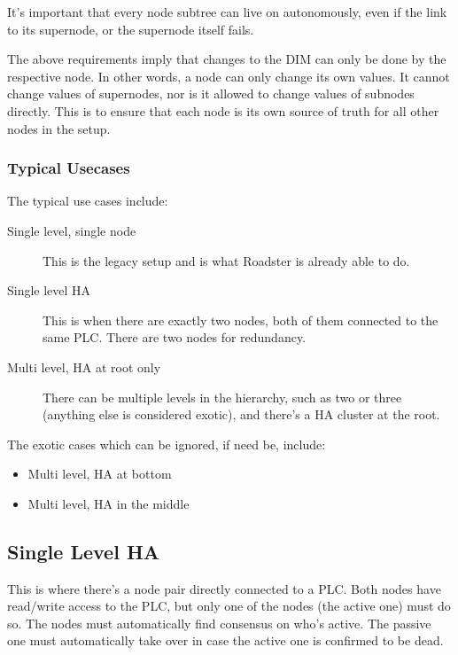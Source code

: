 It's important that every node subtree can live on autonomously, even if the
link to its supernode, or the supernode itself fails.

The above requirements imply that changes to the DIM can only be done by the
respective node. In other words, a node can only change its own values. It
cannot change values of supernodes, nor is it allowed to change values of
subnodes directly. This is to ensure that each node is its own source of truth
for all other nodes in the setup.


\subsubsection{Typical Usecases}
The typical use cases include:

\begin{description}
	\item [ Single level, single node ]
		This is the legacy setup and is what Roadster is already able to do.

	\item [ Single level \gls{HA} ]
		This is when there are exactly two nodes, both of them
		connected to the same PLC. There are two nodes for redundancy.

	\item [ Multi level, \gls{HA} at root only ]
		There can be multiple levels in the hierarchy, such as two or
		three (anything else is considered exotic), and there's a HA
		cluster at the root.
\end{description}

The exotic cases which can be ignored, if need be, include:

\begin{itemize}
	\item Multi level, HA at bottom
	\item Multi level, HA in the middle
\end{itemize}


\subsection{Single Level HA}
This is where there's a node pair directly connected to a PLC. Both nodes have
read\slash write access to the PLC, but only one of the nodes (the active one)
must do so. The nodes must automatically find consensus on who's active. The
passive one must automatically take over in case the active one is confirmed to
be dead.\\


